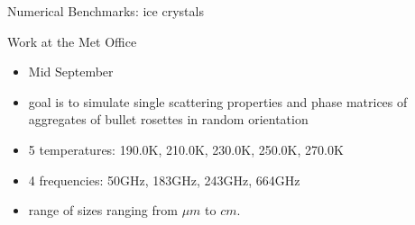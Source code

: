 \documentclass[12pt]{beamer}
\begin{document}
\begin{frame}{Numerical Benchmarks: ice crystals}
\begin{table}[ht!]
\centering
{}
\end{table} 
\end{frame}

\begin{frame}{Work at the Met Office}
    \begin{itemize}
        \item Mid September
        \item goal is to simulate single scattering properties and phase matrices of aggregates of bullet rosettes in random orientation
        \item 5 temperatures: 190.0K, 210.0K, 230.0K, 250.0K, 270.0K
        \item 4 frequencies: 50GHz, 183GHz, 243GHz, 664GHz
        \item range of sizes ranging from $\mu m$ to $cm$.
    \end{itemize}
\end{frame}
\end{document}
